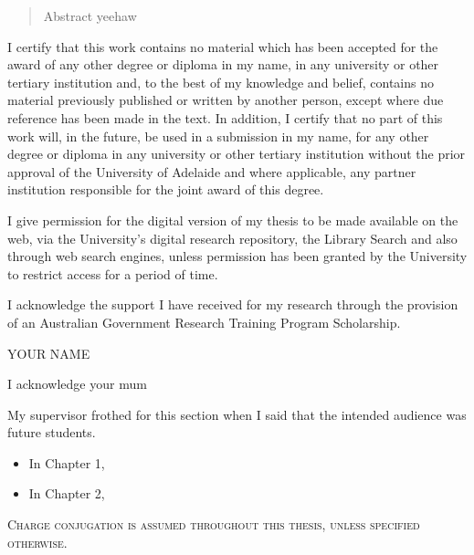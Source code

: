 
\thispagestyle{empty}
\setcounter{page}{-1}

\begin{abstract}
    Abstract yeehaw
\end{abstract}

\begin{declaration}
      I certify that this work contains no material which has been accepted for the award of any other degree or diploma in my name, in any
    university or other tertiary institution and, to the best of my knowledge and belief, contains no material previously published or written by
    another person, except where due reference has been made in the text. In addition, I certify that no part of this work will, in the future, be used
    in a submission in my name, for any other degree or diploma in any university or other tertiary institution without the prior approval of the
    University of Adelaide and where applicable, any partner institution responsible for the joint award of this degree.

    I give permission for the digital version of my thesis to be made available on the web, via the University’s digital research repository, the
    Library Search and also through web search engines, unless permission has been granted by the University to restrict access for a period of
    time.

    I acknowledge the support I have received for my research through the provision of an Australian Government Research Training Program
    Scholarship.
    \vspace*{1cm}
  \begin{flushright}
       YOUR NAME
  \end{flushright}
\end{declaration}

\dedication{Dedicated to ya mum}

\begin{acknowledgements}
    I acknowledge your mum
\end{acknowledgements}

\begin{preface}
    My supervisor frothed for this section when I said that the intended audience was future students.
    \begin{itemize}
        \item In Chapter 1, 
         \item In Chapter 2,
    \end{itemize}
    \vfill
   \begin{center}
       \scshape{Charge conjugation is assumed throughout this thesis, unless specified otherwise.} 
     \end{center}
\end{preface}

\tableofcontents

\listoffigures
\listoftables

\clearpage%
\if@twoside\clearpage\fi

\thispagestyle{empty}
\setcounter{page}{-1}

